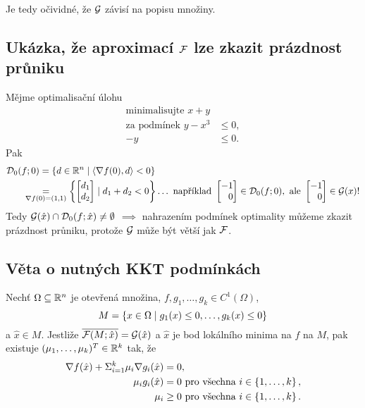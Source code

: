 Je tedy očividné, že $\mathcal{G}$ závisí na popisu množiny.

\subsection{Ukázka, že aproximací \texorpdfstring{$\mathcal{F}$}{F} lze zkazit prázdnost průniku}
Mějme optimalisační úlohu
\begin{align*}
    \text{minimalisujte } x + y \\
    \text{za podmínek } y - x^3 &\leq 0, \\
     - y &\leq 0.
\end{align*}
Pak
\begin{align*}
    \mathcal{D}_0(f; 0) &= \left\lbrace d \in \mathbb{R}^n \mid \langle \nabla f(0), d\rangle < 0 \right\rbrace \\
    &\hspace*{-1.8em}\underset{\nabla f(0) = (1, 1)}{=} \left\lbrace 
    \begin{bmatrix}
        d_1 \\
        d_2
    \end{bmatrix} \mid d_1 + d_2 < 0 \right\rbrace \dots \text{ například } 
    \begin{bmatrix}
        -1 \\
        \phantom{-}0
    \end{bmatrix} \in \mathcal{D}_0(f; 0), \text{ ale } 
    \begin{bmatrix}
        -1 \\
        \phantom{-}0
    \end{bmatrix} \in \mathcal{G}(x)!
\end{align*}
Tedy $\mathcal{G}(\hat x) \cap \mathcal{D}_0(f; \hat x) \not= \emptyset$ $\implies$ nahrazením podmínek optimality můžeme zkazit prázdnost 
průniku, protože $\mathcal{G}$ může být větší jak $\mathcal{F}$.
\newpage
\subsection{Věta o nutných KKT podmínkách}\label{KKT}
Nechť $\Omega \subseteq \mathbb{R}^n$ je otevřená množina, $f, g_1, \dots, g_k \in C^1 (\Omega)$,
\[
    M = \left\lbrace x \in \Omega \mid g_1(x) \leq 0, \dots, g_k(x) \leq 0 \right\rbrace
\]
a $\hat x \in M$. Jestliže $\overline{\mathcal{F}(M; \hat x)} = \mathcal{G}(\hat x)$ a $\hat x$ je bod lokálního minima na $f$ na $M$, 
pak existuje ${(\mu_1, \dots, \mu_k)^T \in \mathbb{R}^k}$ tak, že 
\begin{align*}
    \nabla f(\hat x) + \Sigma_{i=1}^k \mu_i \nabla g_i(\hat x) &= 0, \\
    \mu_i g_i(\hat x) &= 0 \text{ pro všechna } i \in \left\lbrace 1, \dots, k \right\rbrace, \\
    \mu_i &\geq 0 \text{ pro všechna } i \in \left\lbrace 1, \dots, k \right\rbrace.
\end{align*}

